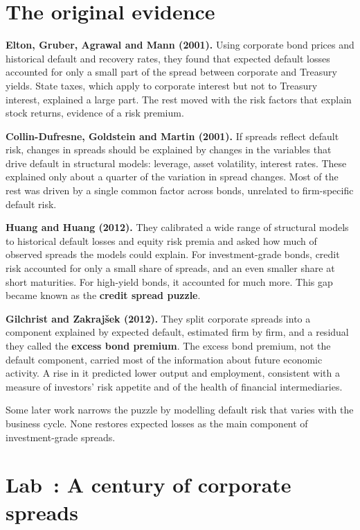 \section{The original evidence}
\label{sec:18-evidence}

\textbf{Elton, Gruber, Agrawal and Mann (2001).} Using corporate bond prices and historical default and recovery rates, they found that expected default losses accounted for only a small part of the spread between corporate and Treasury yields. State taxes, which apply to corporate interest but not to Treasury interest, explained a large part. The rest moved with the risk factors that explain stock returns, evidence of a risk premium.

\textbf{Collin-Dufresne, Goldstein and Martin (2001).} If spreads reflect default risk, changes in spreads should be explained by changes in the variables that drive default in structural models: leverage, asset volatility, interest rates. These explained only about a quarter of the variation in spread changes. Most of the rest was driven by a single common factor across bonds, unrelated to firm-specific default risk.

\textbf{Huang and Huang (2012).} They calibrated a wide range of structural models to historical default losses and equity risk premia and asked how much of observed spreads the models could explain. For investment-grade bonds, credit risk accounted for only a small share of spreads, and an even smaller share at short maturities. For high-yield bonds, it accounted for much more. This gap became known as the \textbf{credit spread puzzle}.

\textbf{Gilchrist and Zakraj\v{s}ek (2012).} They split corporate spreads into a component explained by expected default, estimated firm by firm, and a residual they called the \textbf{excess bond premium}. The excess bond premium, not the default component, carried most of the information about future economic activity. A rise in it predicted lower output and employment, consistent with a measure of investors' risk appetite and of the health of financial intermediaries.

Some later work narrows the puzzle by modelling default risk that varies with the business cycle. None restores expected losses as the main component of investment-grade spreads.

\section{Lab~\thechapter: A century of corporate spreads}
\label{sec:18-lab}


